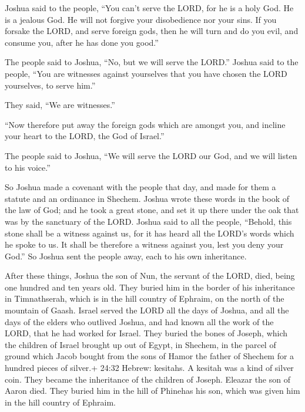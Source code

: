  Joshua said to the people, ``You can't serve the LORD, for
he is a holy God. He is a jealous God. He will not forgive your
disobedience nor your sins.  If you forsake the LORD, and
serve foreign gods, then he will turn and do you evil, and consume you,
after he has done you good.''

 The people said to Joshua, ``No, but we will serve the
LORD.''  Joshua said to the people, ``You are witnesses
against yourselves that you have chosen the LORD yourselves, to serve
him.''

They said, ``We are witnesses.''

 ``Now therefore put away the foreign gods which are
amongst you, and incline your heart to the LORD, the God of Israel.''

 The people said to Joshua, ``We will serve the LORD our
God, and we will listen to his voice.''

 So Joshua made a covenant with the people that day, and
made for them a statute and an ordinance in Shechem. 
Joshua wrote these words in the book of the law of God; and he took a
great stone, and set it up there under the oak that was by the sanctuary
of the LORD.  Joshua said to all the people, ``Behold, this
stone shall be a witness against us, for it has heard all the LORD's
words which he spoke to us. It shall be therefore a witness against you,
lest you deny your God.''  So Joshua sent the people away,
each to his own inheritance.

 After these things, Joshua the son of Nun, the servant of
the LORD, died, being one hundred and ten years old.  They
buried him in the border of his inheritance in Timnathserah, which is in
the hill country of Ephraim, on the north of the mountain of Gaash.
 Israel served the LORD all the days of Joshua, and all the
days of the elders who outlived Joshua, and had known all the work of
the LORD, that he had worked for Israel.  They buried the
bones of Joseph, which the children of Israel brought up out of Egypt,
in Shechem, in the parcel of ground which Jacob bought from the sons of
Hamor the father of Shechem for a hundred pieces of silver.+ 24:32
Hebrew: kesitahs. A kesitah was a kind of silver coin. They became the
inheritance of the children of Joseph.  Eleazar the son of
Aaron died. They buried him in the hill of Phinehas his son, which was
given him in the hill country of Ephraim.
